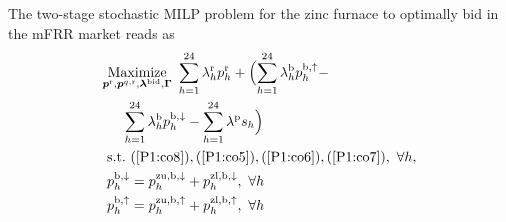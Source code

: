 \documentclass[conference]{IEEEtran}
\begin{document}
{%

\begingroup
\allowdisplaybreaks
The two-stage stochastic MILP problem for the zinc furnace to optimally bid in the mFRR market reads as
%
\begin{subequations}\label{P2:FinalModel}
    \begin{align}
           & \underset{\bm{p}^{\rm{r}}, \bm{p}^{q,\rm{r}}, \bm{\lambda}^{\rm{bid}}, \bm{\Gamma}}{\text{Maximize}} \ \sum_{h=1}^{24}\lambda_{h}^{\rm{r}} p^{\rm{r}}_{h}+ \Bigl(\sum_{h=1}^{24}  \lambda_{h}^{\rm{b}} p^{\rm{b},\uparrow}_{h} - \notag                                                                                                                                                                                                                                                            \\  &  \hspace{0.5cm}\sum_{h=1}^{24}  \lambda_{h}^{\rm{b}} p^{\rm{b},\downarrow}_{h} - \sum_{h=1}^{24}  \lambda^{\rm{p}}s_{h} \Bigr) \label{P2:1} \\
           & \   \text{s.t.}  \  (\ref{P1:co8}), (\ref{P1:co5}), (\ref{P1:co6}), (\ref{P1:co7}), \ \forall{h},   \label{P2:2}                                                                                                                                                                                                                                                                                                                                                                                                                                                           \\
           & \ p^{\rm{b},\downarrow}_{h} = p^{\rm{zu}, \rm{b},\downarrow}_{h} + p^{\rm{zl}, \rm{b},\downarrow}_{h}, \ \forall{h} \label{P2:3} \\
           & \ p^{\rm{b},\uparrow}_{h} = p^{\rm{zu}, \rm{b},\uparrow}_{h} + p^{\rm{zl}, \rm{b},\uparrow}_{h}, \ \forall{h} \label{P2:33} \\

\end{align}
\end{subequations}}
\end{document}
